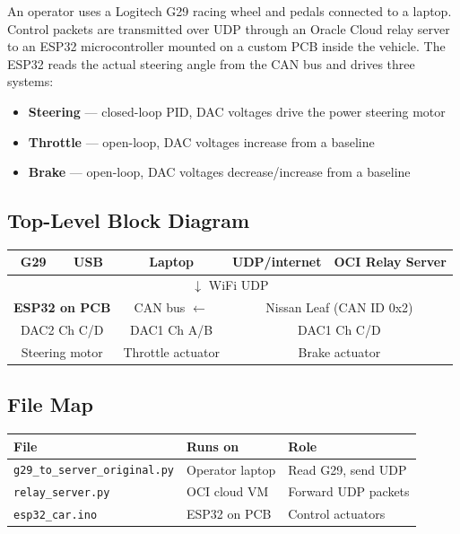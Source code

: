 \documentclass[12pt, letterpaper]{article}
\begin{document}
An operator uses a Logitech G29 racing wheel and pedals connected to a laptop.
Control packets are transmitted over UDP through an Oracle Cloud relay server to an
ESP32 microcontroller mounted on a custom PCB inside the vehicle.  The ESP32 reads
the actual steering angle from the CAN bus and drives three systems:

\begin{itemize}
  \item \textbf{Steering} --- closed-loop PID, DAC voltages drive the power steering motor
  \item \textbf{Throttle} --- open-loop, DAC voltages increase from a baseline
  \item \textbf{Brake}    --- open-loop, DAC voltages decrease/increase from a baseline
\end{itemize}

\subsection{Top-Level Block Diagram}

\begin{center}
\renewcommand{\arraystretch}{1.4}
\small\ttfamily
\begin{tabular}{|c|c|c|c|c|}
  \hline
  \textrm{\textbf{G29}} & \textrm{USB} &
  \textrm{\textbf{Laptop}} & \textrm{UDP/internet} &
  \textrm{\textbf{OCI Relay Server}} \\
  \hline
  \multicolumn{5}{c}{$\downarrow$ WiFi UDP} \\
  \hline
  \multicolumn{2}{|c|}{\textrm{\textbf{ESP32 on PCB}}} &
  \multicolumn{1}{c|}{CAN bus $\leftarrow$} &
  \multicolumn{2}{c|}{\textrm{Nissan Leaf (CAN ID 0x2)}} \\
  \hline
  \multicolumn{2}{|c|}{DAC2 Ch C/D} &
  \multicolumn{1}{c|}{DAC1 Ch A/B} &
  \multicolumn{2}{c|}{DAC1 Ch C/D} \\
  \hline
  \multicolumn{2}{|c|}{Steering motor} &
  \multicolumn{1}{c|}{Throttle actuator} &
  \multicolumn{2}{c|}{Brake actuator} \\
  \hline
\end{tabular}
\end{center}

\subsection{File Map}

\begin{center}
\begin{tabular}{lll}
  \toprule
  \textbf{File} & \textbf{Runs on} & \textbf{Role} \\
  \midrule
  \texttt{g29\_to\_server\_original.py} & Operator laptop & Read G29, send UDP \\
  \texttt{relay\_server.py}             & OCI cloud VM    & Forward UDP packets \\
  \texttt{esp32\_car.ino}               & ESP32 on PCB    & Control actuators \\
  \bottomrule
\end{tabular}
\end{center}
\end{document}
